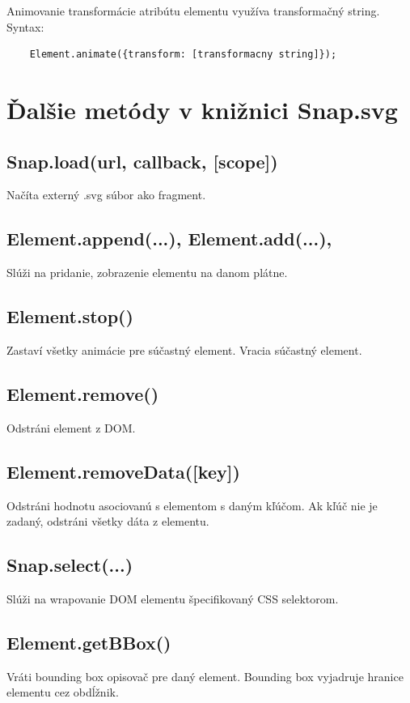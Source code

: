 Animovanie transformácie atribútu elementu využíva transformačný string.  Syntax: 
\begin{lstlisting}
	Element.animate({transform: [transformacny string]});
\end{lstlisting}


\section{Ďalšie metódy v knižnici Snap.svg}

\subsection*{Snap.load(url, callback, [scope])}
Načíta externý .svg súbor ako fragment. 
\subsection*{Element.append(...), Element.add(...), }
Slúži na pridanie, zobrazenie elementu na danom plátne. 
\subsection*{Element.stop()}
Zastaví všetky animácie pre súčastný element. Vracia súčastný element. 
\subsection*{Element.remove()}
Odstráni element z DOM. 
\subsection*{Element.removeData([key])}
Odstráni hodnotu asociovanú s elementom s daným kľúčom. Ak kľúč nie je zadaný, odstráni všetky dáta z elementu. 
\subsection*{Snap.select(...)}
Slúži na wrapovanie DOM elementu špecifikovaný CSS selektorom.  
\subsection*{Element.getBBox()}
Vráti bounding box opisovač pre daný element. Bounding box vyjadruje hranice elementu cez obdĺžnik. 

